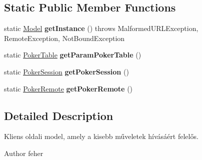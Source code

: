 \subsection*{Static Public Member Functions}
\begin{DoxyCompactItemize}
\item 
\hypertarget{classhu_1_1elte_1_1bfw1p6_1_1poker_1_1client_1_1model_1_1_model_aeee6da384a3a0c616efc04095e38d474}{}static \hyperlink{classhu_1_1elte_1_1bfw1p6_1_1poker_1_1client_1_1model_1_1_model}{Model} {\bfseries get\+Instance} ()  throws Malformed\+U\+R\+L\+Exception, Remote\+Exception, Not\+Bound\+Exception \label{classhu_1_1elte_1_1bfw1p6_1_1poker_1_1client_1_1model_1_1_model_aeee6da384a3a0c616efc04095e38d474}

\item 
\hypertarget{classhu_1_1elte_1_1bfw1p6_1_1poker_1_1client_1_1model_1_1_model_a1fd21b5ec2a7f44d28ef15c8d9696806}{}static \hyperlink{classhu_1_1elte_1_1bfw1p6_1_1poker_1_1model_1_1entity_1_1_poker_table}{Poker\+Table} {\bfseries get\+Param\+Poker\+Table} ()\label{classhu_1_1elte_1_1bfw1p6_1_1poker_1_1client_1_1model_1_1_model_a1fd21b5ec2a7f44d28ef15c8d9696806}

\item 
\hypertarget{classhu_1_1elte_1_1bfw1p6_1_1poker_1_1client_1_1model_1_1_model_a3f147952ff30aa7faaba5ba02e5d9b75}{}static \hyperlink{classhu_1_1elte_1_1bfw1p6_1_1poker_1_1model_1_1_poker_session}{Poker\+Session} {\bfseries get\+Poker\+Session} ()\label{classhu_1_1elte_1_1bfw1p6_1_1poker_1_1client_1_1model_1_1_model_a3f147952ff30aa7faaba5ba02e5d9b75}

\item 
\hypertarget{classhu_1_1elte_1_1bfw1p6_1_1poker_1_1client_1_1model_1_1_model_ac7781b80c70cb5b983b1c7672b4982ed}{}static \hyperlink{interfacehu_1_1elte_1_1bfw1p6_1_1poker_1_1rmi_1_1_poker_remote}{Poker\+Remote} {\bfseries get\+Poker\+Remote} ()\label{classhu_1_1elte_1_1bfw1p6_1_1poker_1_1client_1_1model_1_1_model_ac7781b80c70cb5b983b1c7672b4982ed}

\end{DoxyCompactItemize}


\subsection{Detailed Description}
Kliens oldali model, amely a kisebb műveletek hívásáért felelős. \begin{DoxyAuthor}{Author}
feher 
\end{DoxyAuthor}



